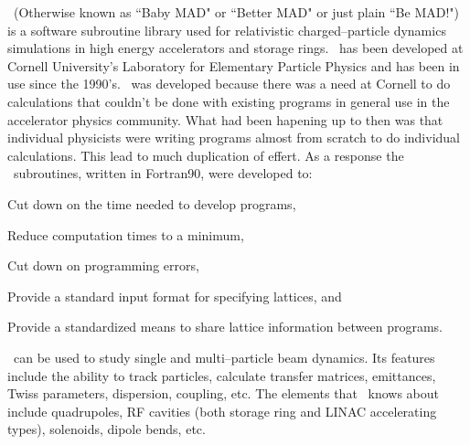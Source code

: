 
\bmad\ (Otherwise known as ``Baby MAD" or ``Better MAD" or just plain
``Be MAD!")  is a software subroutine library used for relativistic
charged--particle dynamics simulations in high energy accelerators and
storage rings. \bmad\ has been developed at Cornell University's
Laboratory for Elementary Particle Physics and has been in use since the
1990's. \bmad\ was developed because there was a need at Cornell to do
calculations that couldn't be done with existing programs in general use
in the accelerator physics community. What had been hapening up to then
was that individual physicists were writing programs almost from scratch 
to do individual calculations. This lead to much duplication of effert.
As a response the \bmad\ subroutines, written in
Fortran90, were developed to:
\begin{Itemize}
\item Cut down on the time needed to develop programs,
\item Reduce computation times to a minimum,
\item Cut down on programming errors, 
\item Provide a standard input format for specifying lattices, and
\item Provide a standardized means to share lattice information between 
programs.
\end{Itemize}

\bmad\ can be used to study single and multi--particle beam dynamics. Its 
features include the ability to track particles, calculate transfer matrices,
emittances, Twiss parameters, 
dispersion, coupling, etc. The elements that \bmad\ knows about include
quadrupoles, RF cavities (both storage ring and LINAC accelerating types),
solenoids, dipole bends, etc. 

\vfill
\break
